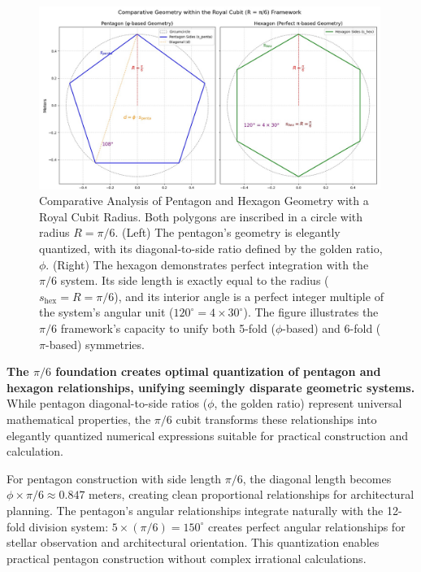 \documentclass[11pt]{article}
\begin{document}
\begin{figure}[h!]
\centering
\includegraphics[width=0.99\textwidth]{figures/pentagon-fig.jpeg}
\caption{Comparative Analysis of Pentagon and Hexagon Geometry with a Royal Cubit Radius. Both polygons are inscribed in a circle with radius $R = \pi/6$. (Left) The pentagon's geometry is elegantly quantized, with its diagonal-to-side ratio defined by the golden ratio, $\phi$. (Right) The hexagon demonstrates perfect integration with the $\pi/6$ system. Its side length is exactly equal to the radius ($s_{\text{hex}} = R = \pi/6$), and its interior angle is a perfect integer multiple of the system's angular unit ($120^\circ = 4 \times 30^\circ$). The figure illustrates the $\pi/6$ framework's capacity to unify both 5-fold ($\phi$-based) and 6-fold ($\pi$-based) symmetries.}
\label{fig:penta_hexa_comparison}
\end{figure}

\textbf{The $\pi/6$ foundation creates optimal quantization of pentagon and hexagon relationships, unifying seemingly disparate geometric systems.} While pentagon diagonal-to-side ratios ($\phi$, the golden ratio) represent universal mathematical properties, the $\pi/6$ cubit transforms these relationships into elegantly quantized numerical expressions suitable for practical construction and calculation.

For pentagon construction with side length $\pi/6$, the diagonal length becomes $\phi \times \pi/6 \approx 0.847$ meters, creating clean proportional relationships for architectural planning. The pentagon's angular relationships integrate naturally with the 12-fold division system: $5 \times (\pi/6) = 150^\circ$ creates perfect angular relationships for stellar observation and architectural orientation. This quantization enables practical pentagon construction without complex irrational calculations.
\end{document}
